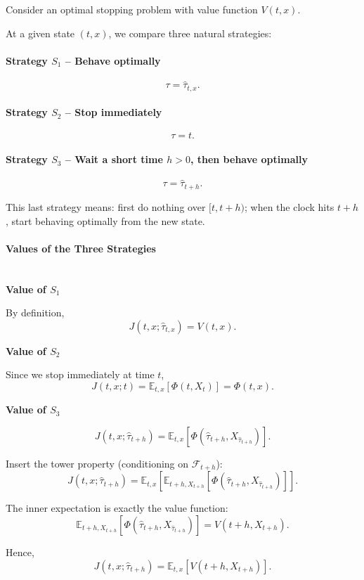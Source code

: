 \documentclass[12pt,a4paper]{article}
\theoremstyle{definition}
\begin{document}
Consider an optimal stopping problem with value function $V(t, x)$.

At a given state $(t, x)$, we compare three natural strategies:

\paragraph{Strategy $S_1$ -- Behave optimally}
\[
\tau = \hat{\tau}_{t,x}.
\]

\paragraph{Strategy $S_2$ -- Stop immediately}
\[
\tau = t.
\]

\paragraph{Strategy $S_3$ -- Wait a short time $h > 0$, then behave optimally}
\[
\tau = \hat{\tau}_{t+h}.
\]

This last strategy means: first do nothing over $[t, t+h)$; when the clock hits $t+h$, start behaving optimally from the new state.

\paragraph{Values of the Three Strategies} \\

\textbf{Value of $S_1$}

By definition,
\[
J(t, x; \hat{\tau}_{t,x}) = V(t, x).
\]

\textbf{Value of $S_2$}

Since we stop immediately at time $t$,
\[
J(t, x; t) = \mathbb{E}_{t,x}\![{\Phi(t, X_t)}] = \Phi(t, x).
\]

\textbf{Value of $S_3$}

\[
J(t, x; \hat{\tau}_{t+h}) = \mathbb{E}_{t,x}\![{\Phi(\hat{\tau}_{t+h}, X_{\hat{\tau}_{t+h}})}].
\]

Insert the tower property (conditioning on $\mathcal{F}_{t+h}$):
\[
J(t, x; \hat{\tau}_{t+h}) = \mathbb{E}_{t,x}\!\left[\mathbb{E}_{t+h, X_{t+h}}[{\Phi(\hat{\tau}_{t+h}, X_{\hat{\tau}_{t+h}})}]\right].
\]

The inner expectation is exactly the value function:
\[
\mathbb{E}_{t+h, X_{t+h}}\![{\Phi(\hat{\tau}_{t+h}, X_{\hat{\tau}_{t+h}})}] = V(t+h, X_{t+h}).
\]

Hence,
\[
J(t, x; \hat{\tau}_{t+h}) = \mathbb{E}_{t,x}[V(t+h, X_{t+h})].
\]
\end{document}
